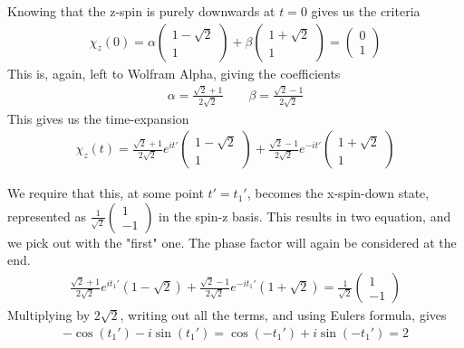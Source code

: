 \documentclass[12p,a4paper]{article}
\newcommand{\0}{\ket{0}}
\newcommand{\1}{\ket{1}}
\renewcommand{\exp}{e^}
\begin{document}
Knowing that the z-spin is purely downwards at $t=0$ gives us the criteria
\begin{align*}
    \chi_z(0) = \alpha \begin{pmatrix} 1 - \sqrt{2} \\ 1 \end{pmatrix}  + \beta \begin{pmatrix} 1 + \sqrt{2} \\ 1 \end{pmatrix} = \begin{pmatrix} 0 \\ 1 \end{pmatrix}
\end{align*}
This is, again, left to Wolfram Alpha, giving the coefficients
\begin{align*}
    \alpha = \frac{\sqrt{2}+1}{2\sqrt{2}}\quad\quad \beta = \frac{\sqrt{2}-1}{2\sqrt{2}}
\end{align*}
This gives us the time-expansion
\begin{align*}
    \chi_z(t) = \frac{\sqrt{2}+1}{2\sqrt{2}} \exp{it'}\begin{pmatrix} 1 - \sqrt{2} \\ 1 \end{pmatrix}  + \frac{\sqrt{2}-1}{2\sqrt{2}} \exp{-it'}\begin{pmatrix} 1 + \sqrt{2} \\ 1 \end{pmatrix}
\end{align*}

We require that this, at some point $t'=t_1'$, becomes the x-spin-down state, represented as $\frac{1}{\sqrt{2}}\begin{pmatrix} 1 \\ -1 \end{pmatrix}$ in the spin-z basis. This results in two equation, and we pick out with the "first" one. The phase factor will again be considered at the end.
\begin{align*}
    \frac{\sqrt{2}+1}{2\sqrt{2}} \exp{it_1'}(1 - \sqrt{2})  + \frac{\sqrt{2}-1}{2\sqrt{2}} \exp{-it_1'}(1 + \sqrt{2}) = \frac{1}{\sqrt{2}}\begin{pmatrix} 1 \\ -1 \end{pmatrix}
\end{align*}
Multiplying by $2\sqrt{2}$, writing out all the terms, and using Eulers formula, gives
\begin{align*}
    -\cos(t_1') -i\sin(t_1') = \cos(-t_1') + i\sin(-t_1') = 2
\end{align*}
\end{document}
